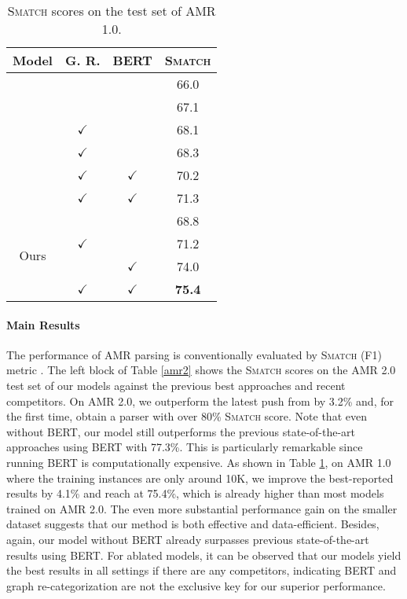 \documentclass[11pt,a4paper]{article}
\begin{document}
	\begin{table}[t]
		\centering
		\small
		\begin{tabular}{c|c|c|c}
			\hline
			Model & \scriptsize{G. R.}& \scriptsize{BERT} & \scriptsize{\textsc{Smatch}} \\
			\hline
			\newcite{flanigan2016cmu}&\texttimes& \texttimes& 66.0 \\
			\newcite{pust2015parsing} &\texttimes& \texttimes& 67.1 \\
			\newcite{wang2017getting} &$\checkmark$& \texttimes& 68.1\\
			\newcite{guo2018better} &$\checkmark$& \texttimes& 68.3 \\
			\newcite{zhang-etal-2019-amr} &$\checkmark$& $\checkmark$& 70.2\\
			\newcite{zhang-etal-2019-broad} &$\checkmark$& $\checkmark$& 71.3 \\
			\hline
			\multirow{4}{*}{Ours} &\texttimes& \texttimes& 68.8\\
			&$\checkmark$& \texttimes& 71.2\\
			&\texttimes &$\checkmark$& 74.0\\
			&$\checkmark$& $\checkmark$&\textbf{75.4}\\
			\hline
		\end{tabular}
		\caption{\textsc{Smatch} scores on the test set of AMR 1.0.}
		\label{amr1}
	\end{table}
	\paragraph{Main Results} The performance of AMR parsing is conventionally evaluated by \textsc{Smatch} (F1) metric \cite{cai2013smatch}. The left block of Table \ref{amr2} shows the \textsc{Smatch} scores on the AMR 2.0 test set of our models against the previous best approaches and recent competitors. On AMR 2.0, we outperform the latest push from  by 3.2\% and, for the first time, obtain a parser with over 80\% \textsc{Smatch} score. Note that even without BERT, our model still outperforms the previous state-of-the-art approaches using BERT \cite{zhang-etal-2019-broad,zhang-etal-2019-amr} with 77.3\%. This is particularly remarkable since running BERT is computationally expensive. As shown in Table \ref{amr1}, on AMR 1.0 where the training instances are only around 10K, we improve the best-reported results by 4.1\% and reach at 75.4\%, which is already higher than most models trained on AMR 2.0. The even more substantial performance gain on the smaller dataset suggests that our method is both effective and data-efficient. Besides, again, our model without BERT already surpasses previous state-of-the-art results using BERT. For ablated models, it can be observed that our models yield the best results in all settings if there are any competitors, indicating BERT and graph re-categorization are not the exclusive key for our superior performance.
\end{document}
